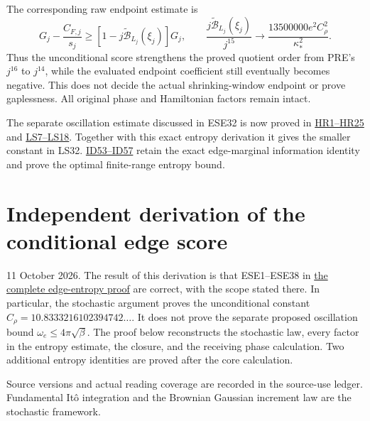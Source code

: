 \documentclass[11pt]{article}
\begin{document}
The corresponding raw endpoint estimate is
\[
 G_j-\frac{C_{F,j}}{s_j}
       \ge[1-j\widetilde{\mathcal B}_{L_j}(\xi_j)]G_j,\qquad
 \frac{j\widetilde{\mathcal B}_{L_j}(\xi_j)}{j^{15}}
       \longrightarrow\frac{13500000e^2C_\rho^2}{\kappa_*^2}.
 \tag{ESE38}
\]
Thus the unconditional score strengthens the proved quotient order from PRE's \(j^{16}\) to \(j^{14}\), while the evaluated endpoint coefficient still eventually becomes negative. This does not decide the actual shrinking-window endpoint or prove gaplessness. All original phase and Hamiltonian factors remain intact.


The separate oscillation estimate discussed in ESE32 is now proved in \href{https://github.com/KokunoYumeto/yang-mills-interacting-workbench/blob/main/yang-mills/continuations/20261011-central-signs-shrinking-window/HEAT_RATIO_PROOF.md}{HR1–HR25} and \href{https://github.com/KokunoYumeto/yang-mills-interacting-workbench/blob/main/yang-mills/continuations/20261011-central-signs-shrinking-window/SQUARE_ROOT_LOCAL_SCORE.md}{LS7–LS18}. Together with this exact entropy derivation it gives the smaller constant in LS32. \href{https://github.com/KokunoYumeto/yang-mills-interacting-workbench/blob/main/yang-mills/continuations/20261011-central-signs-shrinking-window/INDEPENDENT_EDGE_ENTROPY_PROOF.md}{ID53–ID57} retain the exact edge-marginal information identity and prove the optimal finite-range entropy bound.
\clearpage
\section*{Independent derivation of the conditional edge score}

11 October 2026. The result of this derivation is that ESE1–ESE38 in \href{https://github.com/KokunoYumeto/yang-mills-interacting-workbench/blob/main/yang-mills/continuations/20261011-central-signs-shrinking-window/CONDITIONAL_EDGE_ENTROPY_AND_SCORE.md}{the complete edge-entropy proof} are correct, with the scope stated there. In particular, the stochastic argument proves the unconditional constant \(C_\rho=10.8333216102394742\ldots\). It does not prove the separate proposed oscillation bound \(\omega_e\le4\pi\sqrt\beta\). The proof below reconstructs the stochastic law, every factor in the entropy estimate, the closure, and the receiving phase calculation. Two additional entropy identities are proved after the core calculation.

Source versions and actual reading coverage are recorded in the source-use ledger. Fundamental Itô integration and the Brownian Gaussian increment law are the stochastic framework.
\end{document}
